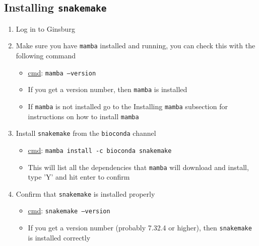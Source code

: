 \documentclass{article}
\begin{document}
    \subsection{Installing \texttt{snakemake}}
    \begin{enumerate}
        \item Log in to Ginsburg

        \item Make sure you have \texttt{mamba} installed and running, you can check this with the following command
        \begin{itemize}
            \item \underline{cmd}: \texttt{mamba --version}
            \item If you get a version number, then \texttt{mamba} is installed
            \item If \texttt{mamba} is not installed go to the Installing \texttt{mamba} subsection for instructions on how to install \texttt{mamba}
        \end{itemize}

        \item Install \texttt{snakemake} from the \texttt{bioconda} channel
        \begin{itemize}
            \item \underline{cmd}: \texttt{mamba install -c bioconda snakemake}
            \item This will list all the dependencies that \texttt{mamba} will download and install, type 'Y' and hit enter to confirm
        \end{itemize}

        \item Confirm that \texttt{snakemake} is installed properly
        \begin{itemize}
            \item \underline{cmd}: \texttt{snakemake --version}
            \item If you get a version number (probably 7.32.4 or higher), then \texttt{snakemake} is installed correctly
        \end{itemize}

    \end{enumerate}

    \noindent\makebox[\linewidth]{\rule{\paperwidth}{0.4pt}}
\end{document}
